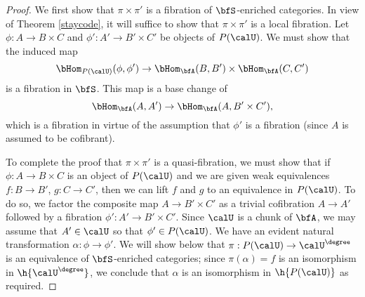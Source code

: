 \begin{proof}
We first show that $\pi \times \pi'$ is a fibration of $\bfS$-enriched
categories. In view of Theorem \ref{staycode}, it will suffice to show that
$\pi \times \pi'$ is a local fibration. Let $\phi: A \rightarrow B \times C$ and 
$\phi': A' \rightarrow B' \times C'$ be objects of $P(\calU)$.
We must show that the induced map
$$ \bHom_{P(\calU)}(\phi,\phi') \rightarrow \bHom_{\bfA}(B,B') \times
\bHom_{\bfA}(C,C')$$ is a fibration in $\bfS$. 
This map is a base change of 
$$ \bHom_{\bfA}(A,A') \rightarrow \bHom_{\bfA}(A, B' \times C'),$$
which is a fibration in virtue of the assumption that $\phi'$ is a fibration (since
$A$ is assumed to be cofibrant).

To complete the proof that $\pi \times \pi'$ is a quasi-fibration,
we must show that if $\phi: A \rightarrow B \times C$ is an object of
$P( \calU)$ and we are given weak equivalences
$f: B \rightarrow B'$, $g: C \rightarrow C'$, then we can lift
$f$ and $g$ to an equivalence in $P(\calU)$. To do so, we factor the composite map $A \rightarrow B' \times C'$ as a
trivial cofibration $A \rightarrow A'$ followed by a fibration
$\phi': A' \rightarrow B' \times C'$. Since $\calU$ is a chunk of $\bfA$, we may assume that
$A' \in \calU$ so that $\phi' \in P(\calU)$. We have an evident natural transformation
$\alpha: \phi \rightarrow \phi'$. We will show below that $\pi: P(\calU) \rightarrow \calU^{\degree}$
is an equivalence of $\bfS$-enriched categories; since $\pi(\alpha) = f$ is an isomorphism
in $\h{ \calU^{\degree}}$, we conclude that $\alpha$ is an isomorphism in $\h{P(\calU)}$ as
required.


\end{proof}

